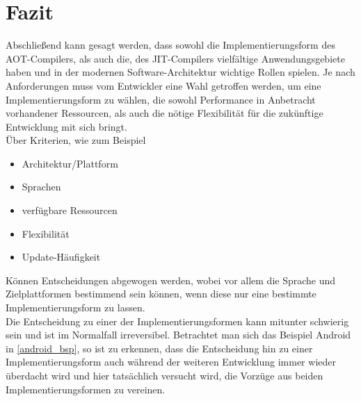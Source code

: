 \chapter{Fazit}
Abschließend kann gesagt werden, dass sowohl die Implementierungsform des \ac{AOT}-Compilers, als auch die, des \ac{JIT}-Compilers vielfältige Anwendungsgebiete haben und in der modernen Software-Architektur wichtige Rollen spielen. 
Je nach Anforderungen muss vom Entwickler eine Wahl getroffen werden, um eine Implementierungsform zu wählen, die sowohl Performance in Anbetracht vorhandener Ressourcen, als auch die nötige Flexibilität für die zukünftige Entwicklung mit sich bringt. \\
Über Kriterien, wie zum Beispiel 
\begin{itemize}
    \item Architektur/Plattform
    \item Sprachen
    \item verfügbare Ressourcen
    \item Flexibilität
    \item Update-Häufigkeit
\end{itemize}
Können Entscheidungen abgewogen werden, wobei vor allem die Sprache und Zielplattformen bestimmend sein können, wenn diese nur eine bestimmte Implementierungsform zu lassen. \\
Die Entscheidung zu einer der Implementierungsformen kann mitunter schwierig sein und ist im Normalfall irreversibel. Betrachtet man sich das Beispiel Android in \autoref{android_bsp}, so ist zu erkennen, dass die Entscheidung hin zu einer Implementierungsform auch während der weiteren Entwicklung immer wieder überdacht wird und hier tatsächlich versucht wird, die Vorzüge aus beiden Implementierungsformen zu vereinen. 